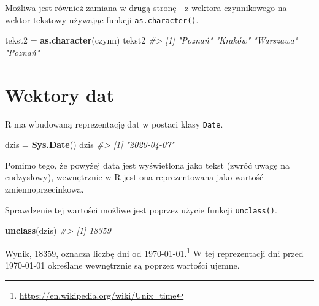 \documentclass[paper=6in:9in,pagesize=pdftex,headinclude=on,footinclude=on,10pt]{scrbook}
\newenvironment{Shaded}{\begin{snugshade}}{\end{snugshade}}
\newcommand{\CommentTok}[1]{\textcolor[rgb]{0.56,0.35,0.01}{\textit{#1}}}
\newcommand{\KeywordTok}[1]{\textcolor[rgb]{0.13,0.29,0.53}{\textbf{#1}}}
\newcommand{\NormalTok}[1]{#1}
\newcommand{\StringTok}[1]{\textcolor[rgb]{0.31,0.60,0.02}{#1}}
\begin{document}
Możliwa jest również zamiana w drugą stronę - z wektora czynnikowego na wektor tekstowy używając funkcji \texttt{as.character()}.

\begin{Shaded}
\begin{Highlighting}[]
\NormalTok{tekst2 =}\StringTok{ }\KeywordTok{as.character}\NormalTok{(czynn)}
\NormalTok{tekst2}
\CommentTok{#> [1] "Poznań"   "Kraków"   "Warszawa" "Poznań"}
\end{Highlighting}
\end{Shaded}

\hypertarget{ate}{%
\section{Wektory dat}\label{ate}}

R ma wbudowaną reprezentację dat w postaci klasy \texttt{Date}.

\begin{Shaded}
\begin{Highlighting}[]
\NormalTok{dzis =}\StringTok{ }\KeywordTok{Sys.Date}\NormalTok{()}
\NormalTok{dzis}
\CommentTok{#> [1] "2020-04-07"}
\end{Highlighting}
\end{Shaded}

Pomimo tego, że powyżej data jest wyświetlona jako tekst (zwróć uwagę na cudzysłowy), wewnętrznie w R jest ona reprezentowana jako wartość zmiennoprzecinkowa.

\begin{Shaded}
\end{Shaded}

Sprawdzenie tej wartości możliwe jest poprzez użycie funkcji \texttt{unclass()}.

\begin{Shaded}
\begin{Highlighting}[]
\KeywordTok{unclass}\NormalTok{(dzis)}
\CommentTok{#> [1] 18359}
\end{Highlighting}
\end{Shaded}

Wynik, 18359, oznacza liczbę dni od 1970-01-01.\footnote{\url{https://en.wikipedia.org/wiki/Unix_time}}
W tej reprezentacji dni przed 1970-01-01 określane wewnętrznie są poprzez wartości ujemne.
\end{document}
